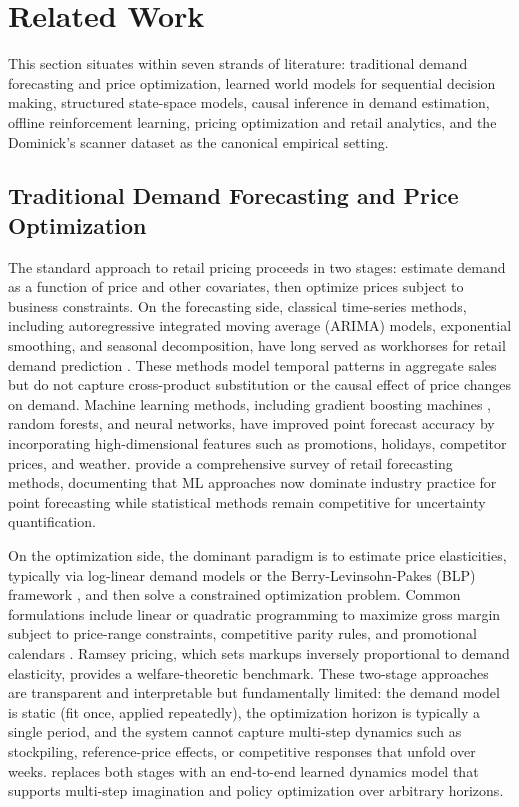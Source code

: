 \section{Related Work}
\label{sec:literature}

This section situates \dreamprice{} within seven strands of literature: traditional demand forecasting and price optimization, learned world models for sequential decision making, structured state-space models, causal inference in demand estimation, offline reinforcement learning, pricing optimization and retail analytics, and the Dominick's scanner dataset as the canonical empirical setting.

\subsection{Traditional Demand Forecasting and Price Optimization}

The standard approach to retail pricing proceeds in two stages: estimate demand as a function of price and other covariates, then optimize prices subject to business constraints. On the forecasting side, classical time-series methods, including autoregressive integrated moving average (ARIMA) models, exponential smoothing, and seasonal decomposition, have long served as workhorses for retail demand prediction \citep{fildes2022retail}. These methods model temporal patterns in aggregate sales but do not capture cross-product substitution or the causal effect of price changes on demand. Machine learning methods, including gradient boosting machines \citep{friedman2001greedy}, random forests, and neural networks, have improved point forecast accuracy by incorporating high-dimensional features such as promotions, holidays, competitor prices, and weather. \citet{fildes2022retail} provide a comprehensive survey of retail forecasting methods, documenting that ML approaches now dominate industry practice for point forecasting while statistical methods remain competitive for uncertainty quantification.

On the optimization side, the dominant paradigm is to estimate price elasticities, typically via log-linear demand models or the Berry-Levinsohn-Pakes (BLP) framework \citep{berry1995automobile}, and then solve a constrained optimization problem. Common formulations include linear or quadratic programming to maximize gross margin subject to price-range constraints, competitive parity rules, and promotional calendars \citep{talluri2004revenue}. Ramsey pricing, which sets markups inversely proportional to demand elasticity, provides a welfare-theoretic benchmark. These two-stage approaches are transparent and interpretable but fundamentally limited: the demand model is static (fit once, applied repeatedly), the optimization horizon is typically a single period, and the system cannot capture multi-step dynamics such as stockpiling, reference-price effects, or competitive responses that unfold over weeks. \dreamprice{} replaces both stages with an end-to-end learned dynamics model that supports multi-step imagination and policy optimization over arbitrary horizons.

